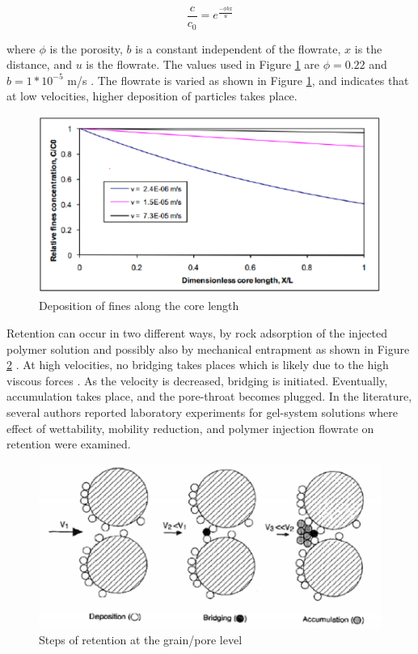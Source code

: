 \begin{equation}
    \frac{c}{c_0} = e^{\frac{-\phi bx}{u}}
\end{equation}

where $\phi$ is the porosity, $b$ is a constant independent of the flowrate, $x$ is the distance, and $u$ is the flowrate. The values used in Figure \ref{fig:finesDeposition} are $\phi = 0.22$ and $b = 1*10^{-5}$ m/s \citep{Stavland2011}. The flowrate is varied as shown in Figure \ref{fig:finesDeposition}, and indicates that at low velocities, higher deposition of particles takes place.

\begin{figure}
    \centering
    \includegraphics[width=\textwidth]{img/fig/finesDeposition.png}
    \caption{Deposition of fines along the core length \citep{Stavland2011}}
    \label{fig:finesDeposition} %
\end{figure}

Retention can occur in two different ways, by rock adsorption of the injected polymer solution and possibly also by mechanical entrapment as shown in Figure \ref{fig:retention} \citep{Nabzar1996}. At high velocities, no bridging takes places which is likely due to the high viscous forces \citep{Stavland2011}. As the velocity is decreased, bridging is initiated. Eventually, accumulation takes place, and the pore-throat becomes plugged. In the literature, several authors reported laboratory experiments for gel-system solutions where effect of wettability, mobility reduction, and polymer injection flowrate on retention were examined\citep{Broseta1995, Cohen1986, Idahosa2016}.

\begin{figure}
    \centering
    \includegraphics[width=\textwidth]{img/fig/retention.png}
    \caption{Steps of retention at the grain/pore level \citep{Nabzar1996}}
    \label{fig:retention} %
\end{figure}



